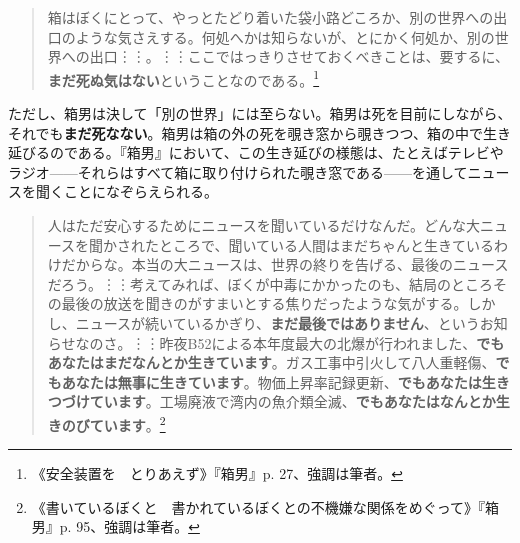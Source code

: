 \documentclass[9pt,b5j,twoside,twocolumn]{utarticle}
\begin{document}
\begin{quotation}
箱はぼくにとって、やっとたどり着いた袋小路どころか、別の世界への出口のような気さえする。何処へかは知らないが、とにかく何処か、別の世界への出口︙︙。︙︙ここではっきりさせておくべきことは、要するに、\textbf{まだ死ぬ気はない}ということなのである。\footnote{《安全装置を　とりあえず》『箱男』p. 27、強調は筆者。}
\end{quotation}

ただし、箱男は決して「別の世界」には至らない。箱男は死を目前にしながら、それでも\textbf{まだ死なない}。箱男は箱の外の死を覗き窓から覗きつつ、箱の中で生き延びるのである。『箱男』において、この生き延びの様態は、たとえばテレビやラジオ------それらはすべて箱に取り付けられた覗き窓である------を通してニュースを聞くことになぞらえられる。

\begin{quotation}
人はただ安心するためにニュースを聞いているだけなんだ。どんな大ニュースを聞かされたところで、聞いている人間はまだちゃんと生きているわけだからな。本当の大ニュースは、世界の終りを告げる、最後のニュースだろう。︙︙考えてみれば、ぼくが中毒にかかったのも、結局のところその最後の放送を聞きのがすまいとする焦りだったような気がする。しかし、ニュースが続いているかぎり、\textbf{まだ最後ではありません}、というお知らせなのさ。︙︙昨夜B52による本年度最大の北爆が行われました、\textbf{でもあなたはまだなんとか生きています}。ガス工事中引火して八人重軽傷、\textbf{でもあなたは無事に生きています}。物価上昇率記録更新、\textbf{でもあなたは生きつづけています}。工場廃液で湾内の魚介類全滅、\textbf{でもあなたはなんとか生きのびています}。\footnote{《書いているぼくと　書かれているぼくとの不機嫌な関係をめぐって》『箱男』p. 95、強調は筆者。}	
\end{quotation}
\end{document}
